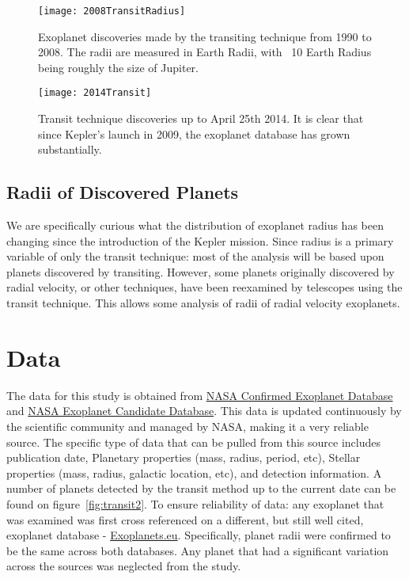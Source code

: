 \documentclass[
10pt, %
a4paper, %
oneside, %
headinclude,footinclude, %
BCOR5mm, %
]{scrartcl}
\begin{document}
\begin{figure}[tb]
\centering 
\texttt{[image: 2008TransitRadius]} 
\caption[>2008 Exoplanet transit discoveries]{Exoplanet discoveries made by the transiting technique from 1990 to 2008. The radii are measured in Earth Radii, with ~10 Earth Radius being roughly the size of Jupiter.}
\label{fig:transit2} 
\end{figure}
\begin{figure}[tb]
\centering 
\texttt{[image: 2014Transit]} 
\caption[Current Transit Technique Discoveries]{Transit technique discoveries up to April 25th 2014. It is clear that since Kepler's launch in 2009, the exoplanet database has grown substantially.}
\label{fig:transit2} 
\end{figure}
\subsection{Radii of Discovered Planets}
We are specifically curious what the distribution of exoplanet radius has been changing since the introduction of the Kepler mission. Since radius is a primary variable of only the transit technique: most of the analysis will be based upon planets discovered by transiting. However, some planets originally discovered by radial velocity, or other techniques, have been reexamined by telescopes using the transit technique. This allows some analysis of radii of radial velocity exoplanets. 


 
\section{Data}
The data for this study is obtained from \href{"http://exoplanetarchive.ipac.caltech.edu/cgi-bin/ExoTables/nph-exotbls?dataset=planets"}{NASA Confirmed Exoplanet Database} and 
\href{"http://exoplanetarchive.ipac.caltech.edu/cgi-bin/ExoTables/nph-exotbls?dataset=cumulative"}{NASA Exoplanet Candidate Database}. This data is updated continuously by the scientific community and managed by NASA, making it a very reliable source. The specific type of data that can be pulled from this source includes publication date, Planetary properties (mass, radius, period, etc), Stellar properties (mass, radius, galactic location, etc), and detection information. A number of planets detected by the transit method up to the current date can be found on figure~\vref{fig:transit2}. To ensure reliability of data: any exoplanet that was examined was first cross referenced on a different, but still well cited, exoplanet database - \href{"http://exoplanets.eu/"}{Exoplanets.eu}. Specifically, planet radii were confirmed to be the same across both databases. Any planet that had a significant variation across the sources was neglected from the study. 
\end{document}
